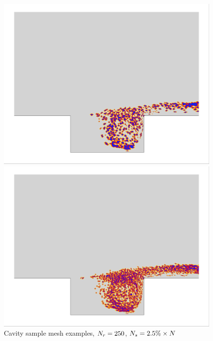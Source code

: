 \begin{figure}
	\begin{minipage}{0.49\linewidth}
		\includegraphics[width=0.99\linewidth,trim={0.5em 0.5em 0.5em 0.5em},clip]{Chapters/HPROMResults/Images/cavity/deim/iBlank_greedy_carlberg_zoom.png}
	\end{minipage}
	\begin{minipage}{0.49\linewidth}
		\includegraphics[width=0.99\linewidth,trim={0.5em 0.5em 0.5em 0.5em},clip]{Chapters/HPROMResults/Images/cavity/deim/iBlank_greedy_ben_zoom.png}
	\end{minipage}
	\caption{\label{fig:cavityiBlank}Cavity sample mesh examples, $N_r= 250$, $N_s = 2.5\% \times N$}
\end{figure}

